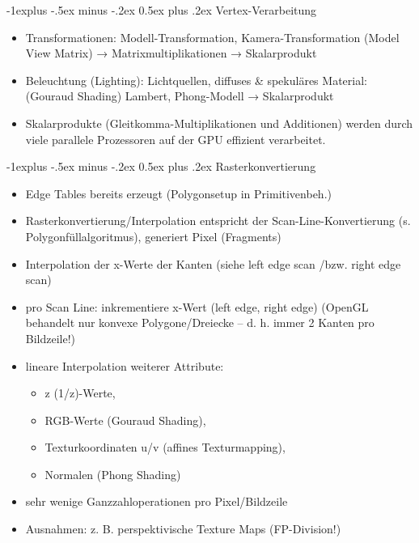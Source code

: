 \documentclass[10pt,landscape]{article}
\makeatletter
\renewcommand{\subsection}{\@startsection{subsection}{2}{0mm}%
                                {-1explus -.5ex minus -.2ex}%
                                {0.5ex plus .2ex}%
                                {\normalfont\normalsize\bfseries}}
\makeatother
\begin{document}
\begin{multicols}{3}
\subsection{Vertex-Verarbeitung}
\begin{itemize}
  \item Transformationen: Modell-Transformation, Kamera-Transformation (Model View Matrix) → Matrixmultiplikationen → Skalarprodukt
  \item Beleuchtung (Lighting): Lichtquellen, diffuses \& spekuläres Material: (Gouraud Shading) Lambert, Phong-Modell → Skalarprodukt
  \item Skalarprodukte (Gleitkomma-Multiplikationen und Additionen) werden durch viele parallele Prozessoren auf der GPU effizient verarbeitet.
\end{itemize}


\subsection{Rasterkonvertierung}
\begin{itemize}
  \item Edge Tables bereits erzeugt (Polygonsetup in Primitivenbeh.)
  \item Rasterkonvertierung/Interpolation entspricht der Scan-Line-Konvertierung (s. Polygonfüllalgoritmus), generiert Pixel (Fragments)
  \item Interpolation der x-Werte der Kanten (siehe left edge scan /bzw. right edge scan)
  \item pro Scan Line: inkrementiere x-Wert (left edge, right edge) (OpenGL behandelt nur konvexe Polygone/Dreiecke – d. h. immer 2 Kanten pro Bildzeile!)
  \item lineare Interpolation weiterer Attribute:
        \begin{itemize}
          \item z (1/z)-Werte,
          \item RGB-Werte (Gouraud Shading),
          \item Texturkoordinaten u/v (affines Texturmapping),
          \item Normalen (Phong Shading)
        \end{itemize}
  \item sehr wenige Ganzzahloperationen pro Pixel/Bildzeile
  \item Ausnahmen: z. B. perspektivische Texture Maps (FP-Division!)
\end{itemize}



\end{multicols}
\end{document}
